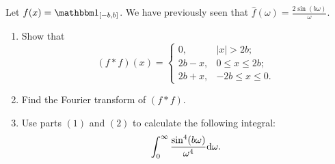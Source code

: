 \documentclass[11pt,a4paper]{article}
\begin{document}
\begin{exercise}
  Let $f(x) = \ind_{[-b,b]}$.
  We have previously seen
  that $\hat{f}(\omega) = \frac{2 \sin(b \omega)}{\omega}$.
  \begin{enumerate}
    \item[(1)] Show that
      \[
        (f * f)(x) =
        \begin{cases}
          0, &|x| > 2b; \\
          2b - x, &0 \le x \le 2b; \\
          2b + x, &-2b \le x \le 0.
        \end{cases}
      \]
    \item[(2)] Find the Fourier transform of $(f * f)$.
    \item[(3)] Use parts $(1)$ and $(2)$
      to calculate the following integral:
      \[
        \int_{0}^{\infty} \frac{\sin^4(b \omega)}{\omega^4} \mathrm{d} \omega.
      \]
  \end{enumerate}
\end{exercise}
\end{document}
